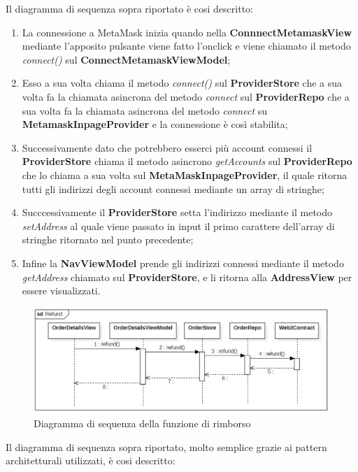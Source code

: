 Il diagramma di sequenza sopra riportato è cosi descritto:

\begin{enumerate}
    \item La connessione a MetaMask inizia quando nella \textbf{ConnnectMetamaskView} mediante l'apposito pulsante viene fatto l'onclick e viene chiamato il metodo \textit{connect()} sul \textbf{ConnectMetamaskViewModel};
    \item Esso a sua volta chiama il metodo \textit{connect()} sul \textbf{ProviderStore} che a sua volta fa la chiamata asincrona del metodo \textit{connect} sul \textbf{ProviderRepo} che a sua volta fa la chiamata asincrona del metodo \textit{connect} su \textbf{MetamaskInpageProvider} e la connessione è così stabilita;
    \item Successivamente dato che potrebbero esserci più account connessi il \textbf{ProviderStore} chiama il metodo asincrono \textit{getAccounts} sul \textbf{ProviderRepo} che lo chiama a sua volta sul \textbf{MetaMaskInpageProvider}, il quale ritorna tutti gli indirizzi degli account connessi mediante un array di stringhe;
    \item Succcessivamente il \textbf{ProviderStore} setta l'indirizzo mediante il metodo \textit{setAddress} al quale viene passato in input il primo carattere dell'array di stringhe ritornato nel punto precedente;
    \item Infine la \textbf{NavViewModel} prende gli indirizzi connessi mediante il metodo \textit{getAddress} chiamato sul \textbf{ProviderStore}, e li ritorna alla \textbf{AddressView} per essere visualizzati.
\end{enumerate}

\begin{figure}[H]
    \centering
    \includegraphics[scale = 0.6]{immagini/refund.png}
    \caption{Diagramma di sequenza della funzione di rimborso}
\end{figure}

Il diagramma di sequenza sopra riportato, molto semplice grazie ai pattern architetturali utilizzati, è cosi descritto:

